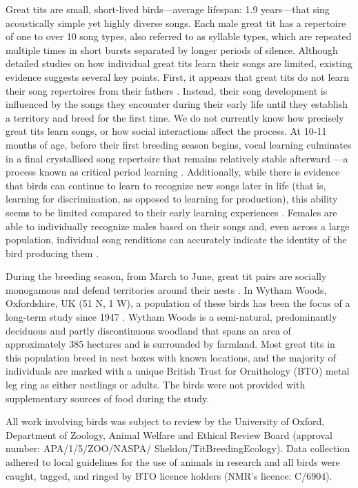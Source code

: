 \documentclass[9pt, onecolumn, twoside, lineno]{gsajnl}
\begin{document}
Great tits are small, short-lived birds---average lifespan: 1.9 years---that sing acoustically simple yet highly diverse songs. Each male great tit has a repertoire of one to over 10 song types, also referred to as syllable types, which are repeated multiple times in short bursts separated by longer periods of silence. Although detailed studies on how individual great tits learn their songs are limited, existing evidence suggests several key points. First, it appears that great tits do not learn their song repertoires from their fathers \autocite{mcgregor1982b}. Instead, their song development is influenced by the songs they encounter during their early life until they establish a territory and breed for the first time. We do not currently know how precisely great tits learn songs, or how social interactions affect the process. At 10-11 months of age, before their first breeding season begins, vocal learning culminates in a final crystallised song repertoire that remains relatively stable afterward \autocite{rivera-gutierrez2011}---a process known as critical period learning \autocite{nottebohm1999, thorpe1958a}. Additionally, while there is evidence that birds can continue to learn to recognize new songs later in life (that is, learning for  discrimination, as opposed to learning for production), this ability seems to be limited compared to their early learning experiences \autocite{mcgregor1986}. Females are able to individually recognize males based on their songs \autocite{lind1996} and, even across a large population, individual song renditions can accurately indicate the identity of the bird producing them \autocite{merinorecalde2023, merinorecalde2024}.

During the breeding season, from March to June, great tit pairs are socially monogamous and defend territories around their nests \autocite{hinde1952}. In Wytham Woods, Oxfordshire, UK (51 N, 1 W), a population of these birds has been the focus of a long-term study since 1947 \autocite{lack1964}. Wytham Woods is a semi-natural, predominantly deciduous and partly discontinuous woodland that spans an area of approximately 385 hectares and is surrounded by farmland. Most great tits in this population breed in nest boxes with known locations, and the majority of individuals are marked with a unique British Trust for Ornithology (BTO) metal leg ring as either nestlings or adults. The birds were not provided with supplementary sources of food during the study.

All work involving birds was subject to review by the University of Oxford, Department of Zoology, Animal Welfare and Ethical Review Board (approval number: APA/1/5/ZOO/NASPA/ Sheldon/TitBreedingEcology). Data collection adhered to local guidelines for the use of animals in research and all birds were caught, tagged, and ringed by BTO licence holders (NMR's licence: C/6904).
\end{document}
